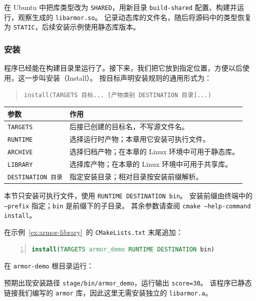 \begin{exercise}\label{ex:v1-build-shared-library}
在 Ubuntu 中把库类型改为 \texttt{SHARED}，用新目录 \texttt{build-shared} 配置、构建并运行，观察生成的 \texttt{libarmor.so}。
记录动态库的文件名，随后将源码中的类型恢复为 \texttt{STATIC}，后续安装示例使用静态库版本。
\end{exercise}

\subsubsection{安装}
\label{sec:cmake-install}

程序已经能在构建目录里运行了。接下来，我们把它放到指定位置，方便以后使用，这一步叫安装（Install）。
按目标声明安装规则的通用形式为：
\begin{quote}
\texttt{install(TARGETS 目标... [产物类别 DESTINATION 目录]...)}
\end{quote}
\begin{center}
\begin{tabular}{p{}p{}}
\toprule[1.5pt]
参数 & 作用 \\
\midrule[1pt]
\texttt{TARGETS} & 后接已创建的目标名，不写源文件名。\\
\texttt{RUNTIME} & 选择运行时产物；本章用它安装可执行文件。\\
\texttt{ARCHIVE} & 选择归档产物；在本章的 Linux 环境中可用于静态库。\\
\texttt{LIBRARY} & 选择库产物；在本章的 Linux 环境中可用于共享库。\\
\texttt{DESTINATION 目录} & 指定安装目录；相对目录按安装前缀解析。\\
\bottomrule[1.5pt]
\end{tabular}
\end{center}
本节只安装可执行文件，使用 \texttt{RUNTIME DESTINATION bin}。
安装前缀由终端中的 \texttt{--prefix} 指定；\texttt{bin} 是前缀下的子目录。
其余参数请查阅 \texttt{cmake --help-command install}。

\begin{example}[安装到自己的练习目录]
在示例~\ref{ex:armor-library}~的 \texttt{CMakeLists.txt} 末尾追加：
\begin{lstlisting}[language=cmake,frame=single,numbers=left]
install(TARGETS armor_demo RUNTIME DESTINATION bin)
\end{lstlisting}
在 \texttt{armor-demo} 根目录运行：
预期出现安装路径 \texttt{stage/bin/armor\_demo}，运行输出 \texttt{score=30}。
该程序已静态链接我们编写的 \texttt{armor} 库，因此这里无需安装独立的 \texttt{libarmor.a}。
\end{example}

